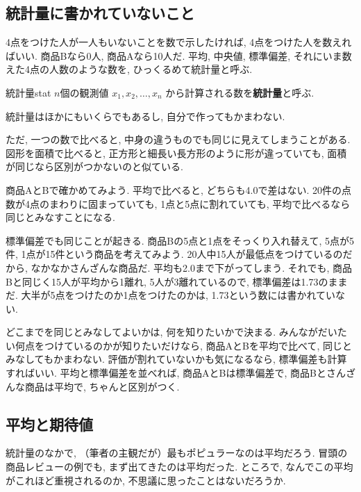   \subsection{統計量に書かれていないこと}

    4点をつけた人が一人もいないことを数で示したければ, 4点をつけた人を数えればいい.
    商品Bなら0人, 商品Aなら10人だ.
    平均, 中央値, 標準偏差, それにいま数えた4点の人数のような数を, ひっくるめて統計量と呼ぶ.

    \begin{defi}{統計量}{stat}
      $n$個の観測値 $x_1, x_2, \ldots, x_n$ から計算される数を\textbf{統計量}と呼ぶ.
    \end{defi}

    統計量はほかにもいくらでもあるし, 自分で作ってもかまわない.

    ただ, 一つの数で比べると, 中身の違うものでも同じに見えてしまうことがある.
    図形を面積で比べると, 正方形と細長い長方形のように形が違っていても, 面積が同じなら区別がつかないのと似ている.

    商品AとBで確かめてみよう.
    平均で比べると, どちらも4.0で差はない.
    20件の点数が4点のまわりに固まっていても, 1点と5点に割れていても, 平均で比べるなら同じとみなすことになる.

    標準偏差でも同じことが起きる.
    商品Bの5点と1点をそっくり入れ替えて, 5点が5件, 1点が15件という商品を考えてみよう.
    20人中15人が最低点をつけているのだから, なかなかさんざんな商品だ.
    平均も2.0まで下がってしまう.
    それでも, 商品Bと同じく15人が平均から1離れ, 5人が3離れているので, 標準偏差は1.73のままだ.
    大半が5点をつけたのか1点をつけたのかは, 1.73という数には書かれていない.

    どこまでを同じとみなしてよいかは, 何を知りたいかで決まる.
    みんながだいたい何点をつけているのかが知りたいだけなら, 商品AとBを平均で比べて, 同じとみなしてもかまわない.
    評価が割れていないかも気になるなら, 標準偏差も計算すればいい.
    平均と標準偏差を並べれば, 商品AとBは標準偏差で, 商品Bとさんざんな商品は平均で, ちゃんと区別がつく.

  \subsection{平均と期待値}

    統計量のなかで, （筆者の主観だが）最もポピュラーなのは平均だろう.
    冒頭の商品レビューの例でも, まず出てきたのは平均だった.
    ところで, なんでこの平均がこれほど重視されるのか, 不思議に思ったことはないだろうか.

